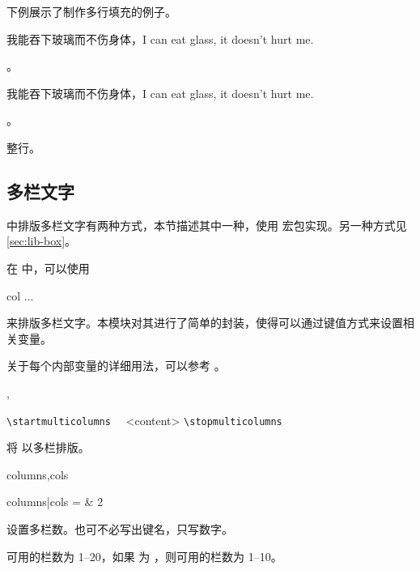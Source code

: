 \documentclass{cusdoc}
\begin{document}
下例展示了制作多行填充的例子。
\begin{xample}
\newcommand\filllines[4][]{{%
  #2\filler[#1]%
  \Replicate{#3-1}{\break \rule{0pt}{0.7\baselineskip}\filler[#1]}%
  #4\par}}

我能吞下玻璃而不伤身体，I can eat glass, it doesn't hurt me.
\filllines{\linespread{2}\selectfont}{3}{。\hspace*{1em}}

我能吞下玻璃而不伤身体，I can eat glass, it doesn't hurt me.
\filllines[color=red,dotted]{\linespread{2}\selectfont}{3}{。\hspace*{1em}}

\filllines [raise=-.5ex]{\linespread{2}\selectfont \noindent\strut}{3}{ 整行。\hspace*{1em}}
\stopxamplecode
\xampleprint  
\end{xample}


\subsection{多栏文字}\label{sec:fmulticol}

\CusTeX 中排版多栏文字有两种方式，本节描述其中一种，使用  宏包实现。另一种方式见\cref{sec:lib-box}。

在  中，可以使用 
\begin{xample}
\begin{multicols}{col}
  ... 
\end{multicols}
\stopxamplecode 
\xamplecode \medskip 
\end{xample}
来排版多栏文字。本模块对其进行了简单的封装，使得可以通过键值方式来设置相关变量。

关于每个内部变量的详细用法，可以参考 。

\begin{function}{\startmulticolumns,\stopmulticolumns}
  \begin{syntax}
    \verb|\startmulticolumns| 
    ~~<content>
    \verb|\stopmulticolumns|
  \end{syntax}
将  以多栏排版。
\end{function}

\begin{keyval}[path=fmulticol]{columns,cols}
  \begin{syntax}
    columns|cols =  & 2
  \end{syntax}
设置多栏数。也可不必写出键名，只写数字。

可用的栏数为 1--20，如果  为
，则可用的栏数为 1--10。
\end{keyval}
\end{document}

